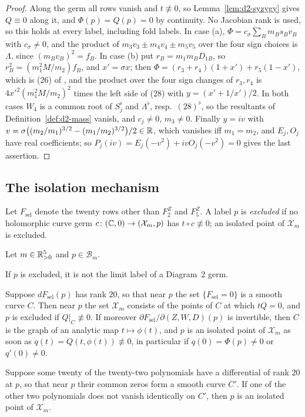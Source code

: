 \begin{proof}
Along the germ all rows vanish and $t\not\equiv0$, so Lemma~\ref{lem:d2-syzygy} gives $Q\equiv0$
along it, and $\Phi(p)=Q(p)=0$ by continuity.  No Jacobian rank is used, so this holds at every
label, including fold labels.
In case (a), $\Phi=c_\sigma\sum_Bm_Bs_Bv_B$ with $c_\sigma\ne0$, and the product of
$m_3v_3\pm m_4v_4\pm m_5v_5$ over the four sign choices is $\Lambda$, since
$(m_Bv_B)^2=f_B$.  In case (b) put $r_B=m_1m_BD_{1B}$, so $r_B^2=(m_1^2M/m_2)f_B$, and
$x'=\sigma x$; then $\Phi=(r_3+r_4)(1+x')+r_5(1-x')$, which is (26) of \cite[\S8.2]{AK}, and the
product over the four sign changes of $r_3,r_4$ is $4x'^2(m_1^2M/m_2)^2$ times the left side of
(28) with $y=(x'+1/x')/2$.
In both cases $W_4$ is a common root of $S_j^\flat$ and $\Lambda^\flat$, resp.\ $(28)^\flat$, so
the resultants of Definition~\ref{def:d2-mass} vanish, and $c_j\ne0$, $m_3\ne0$.  Finally
$y=iv$ with $v=\sigma\bigl((m_2/m_1)^{3/2}-(m_1/m_2)^{3/2}\bigr)/2\in\mathbb{R}$, which vanishes iff
$m_1=m_2$, and $E_j,O_j$ have real coefficients; so $P_j(iv)=E_j(-v^2)+ivO_j(-v^2)=0$ gives the
last assertion.
\end{proof}

\subsection{The isolation mechanism}\label{sec:d2-isolation}

Let $F_{\mathrm{sel}}$ denote the twenty rows other than $F^Z_2$ and $F^Z_5$.  A label $p$ is
\emph{excluded} if no holomorphic curve germ $c\colon(\mathbb{C},0)\to(\mathcal X_m,p)$ has
$t\circ c\not\equiv0$; an isolated point of $\mathcal X_m$ is excluded.

\begin{lemma}\label{lem:d2-isolation}
Let $m\in\mathbb{R}_{>0}^5$ and $p\in\mathcal B_m$.
\begin{alphalist}
  \item If $p$ is excluded, it is not the limit label of a Diagram~2 germ.
  \item Suppose $dF_{\mathrm{sel}}(p)$ has rank $20$, so that near $p$ the set
  $\{F_{\mathrm{sel}}=0\}$ is a smooth curve $C$.  Then near $p$ the set $\mathcal X_m$ consists of the
  points of $C$ at which $tQ=0$, and $p$ is excluded if $Q|_C\not\equiv0$.  If moreover
  $\partial F_{\mathrm{sel}}/\partial(Z,W,D)(p)$ is invertible, then $C$ is the graph of an
  analytic map $t\mapsto\phi(t)$, and $p$ is an isolated point of $\mathcal X_m$ as soon as
  $q(t)=Q(t,\phi(t))\not\equiv0$, in particular if $q(0)=\Phi(p)\ne0$ or $q'(0)\ne0$.
  \item Suppose some twenty of the twenty-two polynomials have a differential of rank $20$ at
  $p$, so that near $p$ their common zeros form a smooth curve $C'$.  If one of the other two
  polynomials does not vanish identically on $C'$, then $p$ is an isolated point of $\mathcal X_m$.
\end{alphalist}
\end{lemma}

